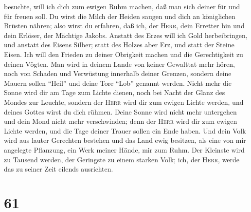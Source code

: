 besuchte, will ich dich zum ewigen Ruhm machen, daß man sich deiner für
und für freuen soll.  Du wirst die Milch der Heiden
saugen und dich an königlichen Brüsten nähren; also wirst du erfahren,
daß ich, der \textsc{Herr}, dein Erretter bin und dein Erlöser, der
Mächtige Jakobs.  Anstatt des Erzes will ich Gold
herbeibringen, und anstatt des Eisens Silber; statt des Holzes aber Erz,
und statt der Steine Eisen. Ich will den Frieden zu deiner Obrigkeit
machen und die Gerechtigkeit zu deinen Vögten.  Man wird
in deinem Lande von keiner Gewalttat mehr hören, noch von Schaden und
Verwüstung innerhalb deiner Grenzen, sondern deine Mauern sollen
``Heil'' und deine Tore ``Lob'' genannt werden.  Nicht
mehr die Sonne wird dir am Tage zum Lichte dienen, noch bei Nacht der
Glanz des Mondes zur Leuchte, sondern der \textsc{Herr} wird dir zum
ewigen Lichte werden, und deines Gottes wirst du dich rühmen.
 Deine Sonne wird nicht mehr untergehen und dein Mond
nicht mehr verschwinden; denn der \textsc{Herr} wird dir zum ewigen
Lichte werden, und die Tage deiner Trauer sollen ein Ende haben.
 Und dein Volk wird aus lauter Gerechten bestehen und das
Land ewig besitzen, als eine von mir angelegte Pflanzung, ein Werk
meiner Hände, mir zum Ruhm.  Der Kleinste wird zu Tausend
werden, der Geringste zu einem starken Volk; ich, der \textsc{Herr},
werde das zu seiner Zeit eilends ausrichten.

\hypertarget{section-60}{%
\section{61}\label{section-60}}

